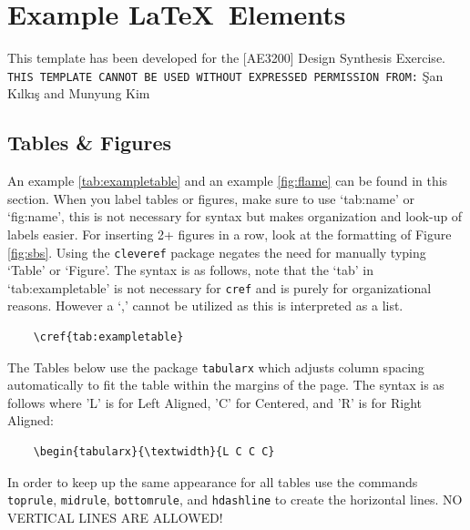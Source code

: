 \chapter{Example \LaTeX\ Elements}
This template has been developed for the [AE3200] Design Synthesis Exercise. \texttt{THIS TEMPLATE CANNOT BE USED WITHOUT EXPRESSED PERMISSION FROM:} \c{S}an K{\i}lk{\i}\c{s} and Munyung Kim

\section{Tables \& Figures}
An example \cref{tab:exampletable} and an example \cref{fig:flame} can be found in this section. When you label tables or figures, make sure to use `tab:name' or `fig:name', this is not necessary for syntax but makes organization and look-up of labels easier. For inserting 2+ figures in a row, look at the formatting of Figure \cref{fig:sbs}. Using the \texttt{cleveref} package negates the need for manually typing `Table' or `Figure'. The syntax is as follows, note that the `tab' in `tab:exampletable' is not necessary for \texttt{cref} and is purely for organizational reasons. However a `,' cannot be utilized as this is interpreted as a list.

\begin{verbatim}
    \cref{tab:exampletable}
\end{verbatim}

The Tables below use the package \texttt{tabularx} which adjusts column spacing automatically to fit the table within the margins of the page. The syntax is as follows where 'L' is for Left Aligned, 'C' for Centered, and 'R' is for Right Aligned:

\begin{verbatim}
    \begin{tabularx}{\textwidth}{L C C C}
\end{verbatim}

In order to keep up the same appearance for all tables use the commands \texttt{toprule}, \texttt{midrule}, \texttt{bottomrule}, and \texttt{hdashline} to create the horizontal lines. NO VERTICAL LINES ARE ALLOWED!


